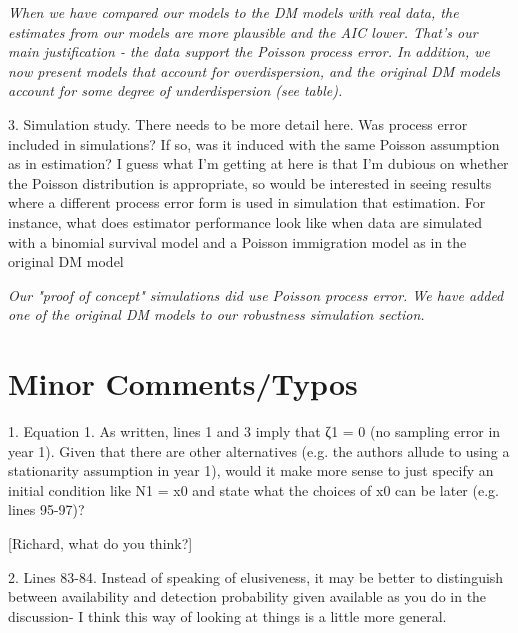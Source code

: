 \documentclass[12pt,english]{article}
\begin{document}
\begin{spacing}{1.9}
\begin{flushleft}
\textit{When we have compared our models to the DM models with real data, the estimates from our models
are more plausible and the AIC lower.  That's our main justification - the data support the Poisson process error.
In addition, we now present models that account for overdispersion, and the original DM models account for
some degree of underdispersion (see table).}

3. Simulation study. There needs to be more detail here. Was process error included in simulations? If so, was it 
induced with the same Poisson assumption as in estimation? I guess what I'm getting at here is that I'm dubious 
on whether the Poisson distribution is appropriate, so would be interested in seeing results where a different process 
error form is used in simulation that estimation. For instance, what does estimator performance look like when data 
are simulated with a binomial survival model and a Poisson immigration model as in the original DM model

\textit{Our "proof of concept" simulations did use Poisson process error.  We have added one of the original DM
models to our robustness simulation section.}

\section*{Minor Comments/Typos}
1. Equation 1. As written, lines 1 and 3 imply that ζ1 = 0 (no sampling error in year 1). Given that there are 
other alternatives (e.g. the authors allude to using a stationarity assumption in year 1), would it make more 
sense to just specify an initial condition like N1 = x0 and state what the choices of x0 can be later (e.g. lines 95-97)?

[Richard, what do you think?]

2. Lines 83-84. Instead of speaking of elusiveness, it may be better to distinguish between availability 
and detection probability given available as you do in the discussion- I think this way of looking at things is a little more general.


\end{flushleft}
\end{spacing}
\end{document}
